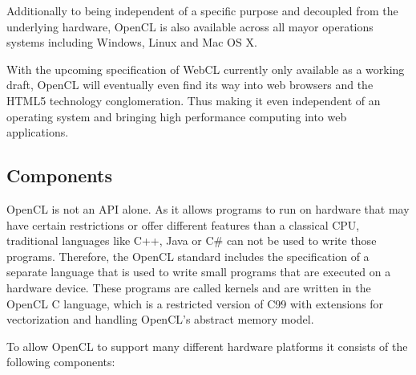 Additionally to being independent of a specific purpose and decoupled from the underlying hardware, OpenCL is also available across all mayor operations systems including Windows, Linux and Mac OS X.

With the upcoming specification of WebCL currently only available as a working draft, OpenCL will eventually even find its way into web browsers and the HTML5 technology conglomeration. Thus making it even independent of an operating system and bringing high performance computing into web applications.

\subsection{Components}

OpenCL is not an API alone. As it allows programs to run on hardware that may have certain restrictions or offer different features than a classical CPU, traditional languages like C++, Java or C\# can not be used to write those programs. Therefore, the OpenCL standard includes the specification of a separate language that is used to write small programs that are executed on a hardware device. These programs are called kernels and are written in the OpenCL C language, which is a restricted version of C99 with extensions for vectorization and handling OpenCL's abstract memory model.

\pagebreak

To allow OpenCL to support many different hardware platforms it consists of the following components:

